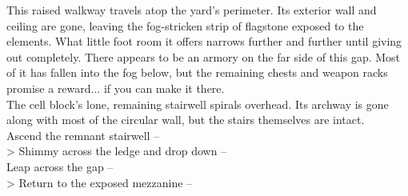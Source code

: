 This raised walkway travels atop the yard's perimeter. Its exterior wall and ceiling are gone, leaving the fog-stricken strip of flagstone exposed to the elements. What little foot room it offers narrows further and further until giving out completely. There appears to be an armory on the far side of this gap. Most of it has fallen into the fog below, but the remaining chests and weapon racks promise a reward... if you can make it there.\\

The cell block's lone, remaining stairwell spirals overhead. Its archway is gone along with most of the circular wall, but the stairs themselves are intact.\\

 Ascend the remnant stairwell -- \\
> Shimmy across the ledge and drop down -- \\
 Leap across the gap -- \\
> Return to the exposed mezzanine -- 